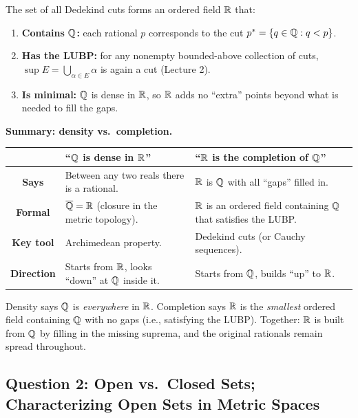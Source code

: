 \documentclass[../master/master.tex]{subfiles}
\begin{document}
The set of all Dedekind cuts forms an ordered field $\mathbb{R}$ that:
\begin{enumerate}
    \item \textbf{Contains $\mathbb{Q}$:} each rational $p$ corresponds to the cut $p^* = \{q \in \mathbb{Q} : q < p\}$.
    \item \textbf{Has the LUBP:} for any nonempty bounded-above collection of cuts, $\sup E = \bigcup_{\alpha \in E} \alpha$ is again a cut (Lecture 2).
    \item \textbf{Is minimal:} $\mathbb{Q}$ is dense in $\mathbb{R}$, so $\mathbb{R}$ adds no ``extra'' points beyond what is needed to fill the gaps.
\end{enumerate}

\begin{notebox}
\textbf{Summary: density vs.\ completion.}
\begin{center}
\renewcommand{\arraystretch}{1.4}
\begin{tabular}{|c|p{5.5cm}|p{5.5cm}|}
\hline
& \textbf{``$\mathbb{Q}$ is dense in $\mathbb{R}$''} & \textbf{``$\mathbb{R}$ is the completion of $\mathbb{Q}$''} \\
\hline
\textbf{Says} & Between any two reals there is a rational. & $\mathbb{R}$ is $\mathbb{Q}$ with all ``gaps'' filled in. \\
\hline
\textbf{Formal} & $\overline{\mathbb{Q}} = \mathbb{R}$ (closure in the metric topology). & $\mathbb{R}$ is an ordered field containing $\mathbb{Q}$ that satisfies the LUBP. \\
\hline
\textbf{Key tool} & Archimedean property. & Dedekind cuts (or Cauchy sequences). \\
\hline
\textbf{Direction} & Starts from $\mathbb{R}$, looks ``down'' at $\mathbb{Q}$ inside it. & Starts from $\mathbb{Q}$, builds ``up'' to $\mathbb{R}$. \\
\hline
\end{tabular}
\end{center}

Density says $\mathbb{Q}$ is \emph{everywhere} in $\mathbb{R}$. Completion says $\mathbb{R}$ is the \emph{smallest} ordered field containing $\mathbb{Q}$ with no gaps (i.e., satisfying the LUBP). Together: $\mathbb{R}$ is built from $\mathbb{Q}$ by filling in the missing suprema, and the original rationals remain spread throughout.
\end{notebox}

\newpage
\subsection{Question 2: Open vs.\ Closed Sets; Characterizing Open Sets in Metric Spaces}
\end{document}
